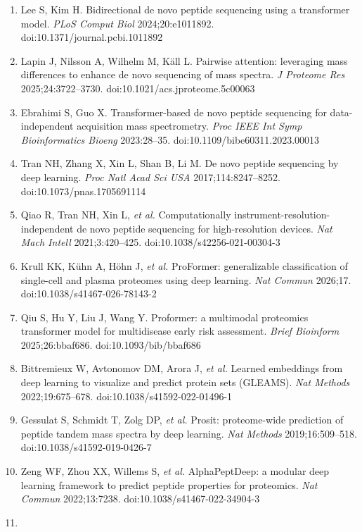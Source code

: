 \documentclass[
]{article}
\begin{document}
\begin{enumerate}
  practical large-scale de novo peptide sequencing. \emph{Brief
  Bioinform} 2024;25:bbae021. doi:10.1093/bib/bbae021
\item
  Lee S, Kim H. Bidirectional de novo peptide sequencing using a
  transformer model. \emph{PLoS Comput Biol} 2024;20:e1011892.
  doi:10.1371/journal.pcbi.1011892
\item
  Lapin J, Nilsson A, Wilhelm M, Käll L. Pairwise attention: leveraging
  mass differences to enhance de novo sequencing of mass spectra.
  \emph{J Proteome Res} 2025;24:3722--3730.
  doi:10.1021/acs.jproteome.5c00063
\item
  Ebrahimi S, Guo X. Transformer-based de novo peptide sequencing for
  data-independent acquisition mass spectrometry. \emph{Proc IEEE Int
  Symp Bioinformatics Bioeng} 2023:28--35.
  doi:10.1109/bibe60311.2023.00013
\item
  Tran NH, Zhang X, Xin L, Shan B, Li M. De novo peptide sequencing by
  deep learning. \emph{Proc Natl Acad Sci USA} 2017;114:8247--8252.
  doi:10.1073/pnas.1705691114
\item
  Qiao R, Tran NH, Xin L, \emph{et al.} Computationally
  instrument-resolution-independent de novo peptide sequencing for
  high-resolution devices. \emph{Nat Mach Intell} 2021;3:420--425.
  doi:10.1038/s42256-021-00304-3
\item
  Krull KK, Kühn A, Höhn J, \emph{et al.} ProFormer: generalizable
  classification of single-cell and plasma proteomes using deep
  learning. \emph{Nat Commun} 2026;17. doi:10.1038/s41467-026-78143-2
\item
  Qiu S, Hu Y, Liu J, Wang Y. Proformer: a multimodal proteomics
  transformer model for multidisease early risk assessment. \emph{Brief
  Bioinform} 2025;26:bbaf686. doi:10.1093/bib/bbaf686
\item
  Bittremieux W, Avtonomov DM, Arora J, \emph{et al.} Learned embeddings
  from deep learning to visualize and predict protein sets (GLEAMS).
  \emph{Nat Methods} 2022;19:675--678. doi:10.1038/s41592-022-01496-1
\item
  Gessulat S, Schmidt T, Zolg DP, \emph{et al.} Prosit: proteome-wide
  prediction of peptide tandem mass spectra by deep learning. \emph{Nat
  Methods} 2019;16:509--518. doi:10.1038/s41592-019-0426-7
\item
  Zeng WF, Zhou XX, Willems S, \emph{et al.} AlphaPeptDeep: a modular
  deep learning framework to predict peptide properties for proteomics.
  \emph{Nat Commun} 2022;13:7238. doi:10.1038/s41467-022-34904-3
\item

\end{enumerate}
\end{document}
